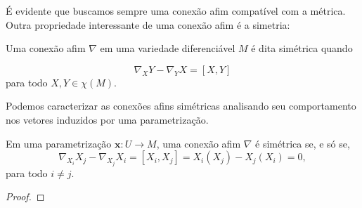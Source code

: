 É evidente que buscamos sempre uma conexão afim compatível com a métrica. Outra propriedade interessante de uma conexão afim é a simetria:
\begin{definition}
    \label{loc:3.4_:_def_5_:_conexão_simétrica..definição}
    Uma conexão afim $\nabla$ em uma variedade diferenciável $M$ é dita simétrica quando

    \begin{equation*}
        \nabla_{X}Y-\nabla_{Y}X=\left[X,Y\right]
    \end{equation*}
    para todo $X, Y \in \chi(M)$.
\end{definition}
Podemos caracterizar as conexões afins simétricas analisando seu comportamento nos vetores induzidos por uma parametrização.
\begin{proposition}
    \label{loc:3.4_:_def_5_:_conexão_simétrica..proposição_:_equivalência}
    Em uma parametrização $\mathbf{x}:U\to M$, uma conexão afim $\nabla$ é simétrica se, e só se,
    \begin{equation*}
        \nabla_{X_{i}}X_{j}-\nabla_{X_{j}}X_{i} = \left[X_{i}, X_{j}\right]=X_{i}(X_{j})-X_{j}(X_{i})=0,
    \end{equation*}
    para todo $i\neq j$.
    \begin{proof}


\end{proof}
\end{proposition}
